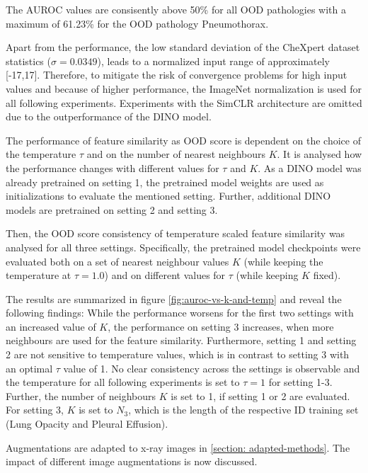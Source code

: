 The AUROC values are consisently above 50\% for all OOD pathologies with a maximum of 61.23\% for the OOD pathology Pneumothorax.
\par
Apart from the performance, the low standard deviation of the CheXpert dataset statistics ($\sigma=0.0349$), leads to a normalized input range of approximately [-17,17].
Therefore, to mitigate the risk of convergence problems for high input values \citep{Lecun2002, He2015, Santurkar2019} and because of higher performance, the ImageNet normalization is used for all following experiments.
Experiments with the SimCLR architecture are omitted due to the outperformance of the DINO model.
\par
The performance of feature similarity as OOD score is dependent on the choice of the temperature $\tau$ and on the number of nearest neighbours $K$.
It is analysed how the performance changes with different values for $\tau$ and $K$.
As a DINO model was already pretrained on setting 1, the pretrained model weights are used as initializations to evaluate the mentioned setting.
Further, additional DINO models are pretrained on setting 2 and setting 3.
\par
Then, the OOD score consistency of temperature scaled feature similarity was analysed for all three settings.
Specifically, the pretrained model checkpoints were evaluated both on a set of nearest neighbour values $K$ (while keeping the temperature at $\tau=1.0$) and on different values for $\tau$ (while keeping $K$ fixed).
\par
The results are summarized in figure \ref{fig:auroc-vs-k-and-temp} and reveal the following findings:
While the performance worsens for the first two settings with an increased value of $K$, the performance on setting 3 increases, when more neighbours are used for the feature similarity.
Furthermore, setting 1 and setting 2 are not sensitive to temperature values, which is in contrast to setting 3 with an optimal $\tau$ value of 1.
No clear consistency across the settings is observable and the temperature for all following experiments is set to $\tau=1$ for setting 1-3.
Further, the number of neighbours $K$ is set to 1, if setting 1 or 2 are evaluated. 
For setting 3, $K$ is set to $N_3$, which is the length of the respective ID training set (Lung Opacity and Pleural Effusion).
\par
Augmentations are adapted to x-ray images in \ref{section: adapted-methods}.
The impact of different image augmentations is now discussed.
